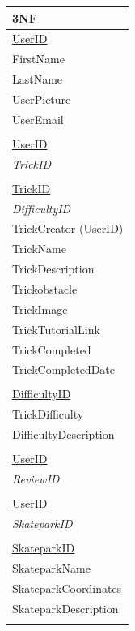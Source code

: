 \begin{center}
\begin{tabular}{|p{4cm}|} \hline
\textbf{3NF} \\ \hline

\underline{UserID} \\ 
FirstName \\
LastName \\
UserPicture \\
UserEmail \\
\hline \\
\hline

\underline{UserID} \\ 
\emph{TrickID}\\
\hline \\
\hline 

\underline{TrickID} \\
\emph{DifficultyID} \\
TrickCreator (UserID) \\
TrickName \\
TrickDescription \\
Trickobstacle \\
TrickImage \\
TrickTutorialLink \\

TrickCompleted \\
TrickCompletedDate \\ \hline
\\ \hline

\underline{DifficultyID} \\
TrickDifficulty \\
DifficultyDescription\\ 
 \hline \\

\hline 
\underline{UserID} \\
\emph{ReviewID} \\

 \hline \\ \hline 

\underline{UserID} \\
\emph{SkateparkID} \\
\hline  \\ \hline 

\underline{SkateparkID} \\
SkateparkName \\
SkateparkCoordinates \\
SkateparkDescription \\ \hline
\\ \hline 


\end{tabular}
\end{center}
